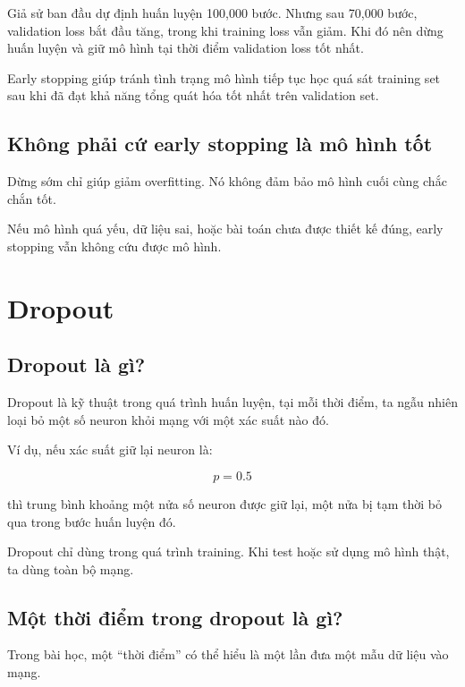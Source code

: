 \documentclass[12pt,a4paper]{report}
\begin{document}
Giả sử ban đầu dự định huấn luyện 100,000 bước. Nhưng sau 70,000 bước, validation loss bắt đầu tăng, trong khi training loss vẫn giảm. Khi đó nên dừng huấn luyện và giữ mô hình tại thời điểm validation loss tốt nhất.

\begin{ghinho}
Early stopping giúp tránh tình trạng mô hình tiếp tục học quá sát training set sau khi đã đạt khả năng tổng quát hóa tốt nhất trên validation set.
\end{ghinho}

\section{Không phải cứ early stopping là mô hình tốt}

Dừng sớm chỉ giúp giảm overfitting. Nó không đảm bảo mô hình cuối cùng chắc chắn tốt.

Nếu mô hình quá yếu, dữ liệu sai, hoặc bài toán chưa được thiết kế đúng, early stopping vẫn không cứu được mô hình.

\chapter{Dropout}

\section{Dropout là gì?}

Dropout là kỹ thuật trong quá trình huấn luyện, tại mỗi thời điểm, ta ngẫu nhiên loại bỏ một số neuron khỏi mạng với một xác suất nào đó.

Ví dụ, nếu xác suất giữ lại neuron là:

\[
    p = 0.5
\]

thì trung bình khoảng một nửa số neuron được giữ lại, một nửa bị tạm thời bỏ qua trong bước huấn luyện đó.

\begin{ghinho}
Dropout chỉ dùng trong quá trình training. Khi test hoặc sử dụng mô hình thật, ta dùng toàn bộ mạng.
\end{ghinho}

\section{Một thời điểm trong dropout là gì?}

Trong bài học, một ``thời điểm'' có thể hiểu là một lần đưa một mẫu dữ liệu vào mạng.
\end{document}
